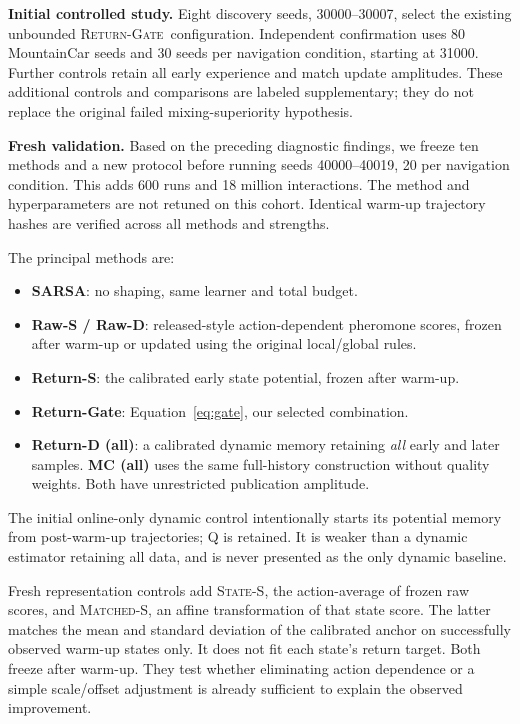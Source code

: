 \documentclass[10pt,twocolumn,letterpaper]{article}
\newcommand{\gate}{\textsc{Return-Gate}}
\newcommand{\states}{\textsc{State-S}}
\newcommand{\matched}{\textsc{Matched-S}}
\begin{document}
\textbf{Initial controlled study.} Eight discovery seeds, 30000--30007, select the existing unbounded \gate\ configuration. Independent confirmation uses 80 MountainCar seeds and 30 seeds per navigation condition, starting at 31000. Further controls retain all early experience and match update amplitudes. These additional controls and comparisons are labeled supplementary; they do not replace the original failed mixing-superiority hypothesis.

\textbf{Fresh validation.} Based on the preceding diagnostic findings, we freeze ten methods and a new protocol before running seeds 40000--40019, 20 per navigation condition. This adds 600 runs and 18 million interactions. The method and hyperparameters are not retuned on this cohort. Identical warm-up trajectory hashes are verified across all methods and strengths.

The principal methods are:
\begin{itemize}
 \item \textbf{SARSA}: no shaping, same learner and total budget.
 \item \textbf{Raw-S / Raw-D}: released-style action-dependent pheromone scores, frozen after warm-up or updated using the original local/global rules.
 \item \textbf{Return-S}: the calibrated early state potential, frozen after warm-up.
 \item \textbf{Return-Gate}: Equation~\ref{eq:gate}, our selected combination.
 \item \textbf{Return-D (all)}: a calibrated dynamic memory retaining \emph{all} early and later samples. \textbf{MC (all)} uses the same full-history construction without quality weights. Both have unrestricted publication amplitude.
\end{itemize}
The initial online-only dynamic control intentionally starts its potential memory from post-warm-up trajectories; Q is retained. It is weaker than a dynamic estimator retaining all data, and is never presented as the only dynamic baseline.

Fresh representation controls add \states, the action-average of frozen raw scores, and \matched, an affine transformation of that state score. The latter matches the mean and standard deviation of the calibrated anchor on successfully observed warm-up states only. It does not fit each state's return target. Both freeze after warm-up. They test whether eliminating action dependence or a simple scale/offset adjustment is already sufficient to explain the observed improvement.
\end{document}
